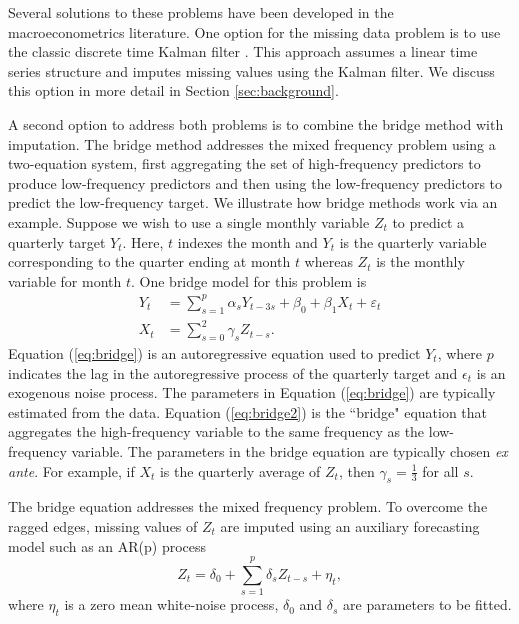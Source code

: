 \documentclass[a4paper, 12pt]{article}
\theoremstyle{remark}
\begin{document}
Several solutions to these problems have been developed in the macroeconometrics literature. One option for the missing data problem is to use the classic discrete time Kalman filter \citep[e.g.][]{kalman1960new,stock2002forecasting,banbura2014maximum}. This approach assumes a linear time series structure and imputes missing values using the Kalman filter. We discuss this option in more detail in Section \ref{sec:background}.

A second option to address both problems is to combine the bridge method \citep{schumacher2016comparison} with imputation. The bridge method addresses the mixed frequency problem using a two-equation system, first aggregating the set of high-frequency predictors to produce low-frequency predictors and then using the low-frequency predictors to predict the low-frequency target. We illustrate how bridge methods work via an example. Suppose we wish to use a single monthly variable $Z_t$ to predict a quarterly target $Y_t$. Here, $t$ indexes the month and $Y_t$ is the quarterly variable corresponding to the quarter ending at month $t$ whereas $Z_t$ is the monthly variable for month $t$. One bridge model for this problem is
\begin{align}\label{eq:bridge}
    Y_t&=\sum_{s=1}^{p} \alpha_s Y_{t-3s} + \beta_0+\beta_1 X_t+\varepsilon_t \\ 
    X_t & = \sum_{s=0}^2 \gamma_s Z_{t-s}.
    \label{eq:bridge2}
\end{align}
Equation (\ref{eq:bridge}) is an autoregressive equation used to predict $Y_t$, where \(p\) indicates the lag in the autoregressive process of the quarterly target and \(\epsilon_t\) is an exogenous noise process. The parameters in Equation (\ref{eq:bridge}) are typically estimated from the data. Equation (\ref{eq:bridge2}) is the ``bridge" equation that aggregates the high-frequency variable to the same frequency as the low-frequency variable. The parameters in the bridge equation are typically chosen \textit{ex ante}. For example, if $X_t$ is the quarterly average of $Z_t$, then $\gamma_s = \frac{1}{3}$ for all $s$.

The bridge equation addresses the mixed frequency problem. To overcome the ragged edges, missing values of $Z_t$ are imputed using an auxiliary forecasting model such as an AR(p) process
\begin{equation*}
     Z_{t} = \delta_{0} + \sum_{s=1}^p \delta_s Z_{t-s} + \eta_{t},
\end{equation*}
where \(\eta_t\) is a zero mean white-noise process, \(\delta_0\) and \(\delta_s\) are parameters to be fitted.
\end{document}
